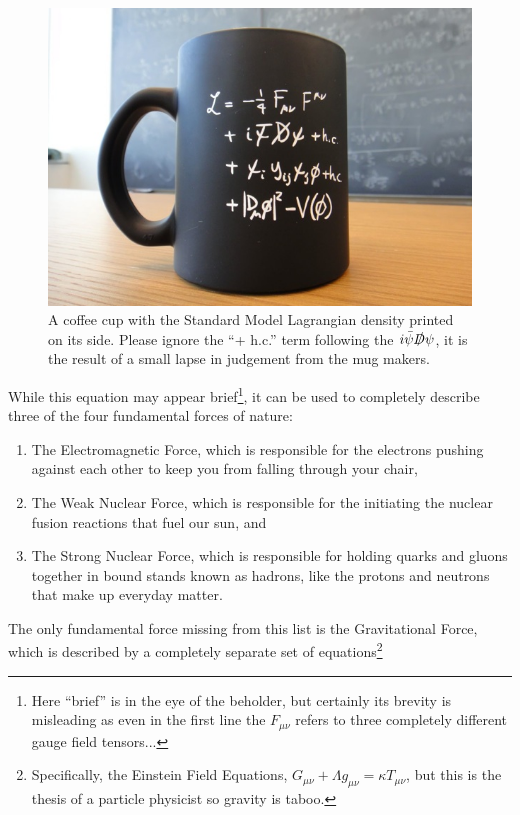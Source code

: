 \begin{figure}
    \centering
    \includegraphics[scale=0.5]{figures/StandardModelCup.jpg}
    \caption{A coffee cup with the Standard Model Lagrangian density printed on its side. Please ignore the ``+ h.c.'' term following the $i\Bar{\psi}\slashed{D}\psi$, it is the result of a small lapse in judgement from the mug makers.}
    \label{fig:my_label}
\end{figure}

While this equation may appear brief\footnote{Here ``brief'' is in the eye of the beholder, but certainly its brevity is misleading as even in the first line the $F_{\mu\nu}$ refers to three completely different gauge field tensors...}, it can be used to completely describe three of the four fundamental forces of nature: 
\begin{enumerate}
    \item The Electromagnetic Force, which is responsible for the electrons pushing against each other to keep you from falling through your chair,
    \item The Weak Nuclear Force,  which is responsible for the initiating the nuclear fusion reactions that fuel our sun, and 
    \item The Strong Nuclear Force,  which is responsible for holding quarks and gluons together in bound stands known as hadrons, like the protons and neutrons that make up everyday matter.
\end{enumerate}
The only fundamental force missing from this list is the Gravitational Force, which is described by a completely separate set of equations\footnote{Specifically, the Einstein Field Equations, $G_{\mu\nu} + \Lambda g_{\mu\nu} = \kappa T_{\mu\nu}$, but this is the thesis of a particle physicist so gravity is taboo.}

